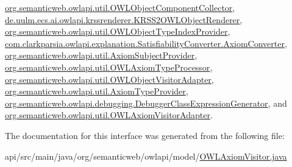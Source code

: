 \hyperlink{classorg_1_1semanticweb_1_1owlapi_1_1util_1_1_o_w_l_object_component_collector_a9f622ddb1305e79e43d2d63a2e794587}{org.\-semanticweb.\-owlapi.\-util.\-O\-W\-L\-Object\-Component\-Collector}, \hyperlink{classde_1_1uulm_1_1ecs_1_1ai_1_1owlapi_1_1krssrenderer_1_1_k_r_s_s2_o_w_l_object_renderer_a200946d7aa46b7c064fdb53d73cddd9e}{de.\-uulm.\-ecs.\-ai.\-owlapi.\-krssrenderer.\-K\-R\-S\-S2\-O\-W\-L\-Object\-Renderer}, \hyperlink{classorg_1_1semanticweb_1_1owlapi_1_1util_1_1_o_w_l_object_type_index_provider_a4288f2f2073c418591f9f8549350c166}{org.\-semanticweb.\-owlapi.\-util.\-O\-W\-L\-Object\-Type\-Index\-Provider}, \hyperlink{classcom_1_1clarkparsia_1_1owlapi_1_1explanation_1_1_satisfiability_converter_1_1_axiom_converter_a9184ebe1647be4b1200a388e9898b145}{com.\-clarkparsia.\-owlapi.\-explanation.\-Satisfiability\-Converter.\-Axiom\-Converter}, \hyperlink{classorg_1_1semanticweb_1_1owlapi_1_1util_1_1_axiom_subject_provider_ad9e13eac0428964cd2d5eb4f854c71db}{org.\-semanticweb.\-owlapi.\-util.\-Axiom\-Subject\-Provider}, \hyperlink{classorg_1_1semanticweb_1_1owlapi_1_1util_1_1_o_w_l_axiom_type_processor_ac7007f8b45fa031633e257ae42fad9b6}{org.\-semanticweb.\-owlapi.\-util.\-O\-W\-L\-Axiom\-Type\-Processor}, \hyperlink{classorg_1_1semanticweb_1_1owlapi_1_1util_1_1_o_w_l_object_visitor_adapter_af7c7cf79cae58c455cbc36b951efda98}{org.\-semanticweb.\-owlapi.\-util.\-O\-W\-L\-Object\-Visitor\-Adapter}, \hyperlink{classorg_1_1semanticweb_1_1owlapi_1_1util_1_1_axiom_type_provider_af3251abd4de117b339fec080d498944a}{org.\-semanticweb.\-owlapi.\-util.\-Axiom\-Type\-Provider}, \hyperlink{classorg_1_1semanticweb_1_1owlapi_1_1debugging_1_1_debugger_class_expression_generator_a5ce8512fde4277c52d807a84b1bcacea}{org.\-semanticweb.\-owlapi.\-debugging.\-Debugger\-Class\-Expression\-Generator}, and \hyperlink{classorg_1_1semanticweb_1_1owlapi_1_1util_1_1_o_w_l_axiom_visitor_adapter_a28cf168e7c3f2ae3154f8aebcc3c1b62}{org.\-semanticweb.\-owlapi.\-util.\-O\-W\-L\-Axiom\-Visitor\-Adapter}.



The documentation for this interface was generated from the following file\-:\begin{DoxyCompactItemize}
\item 
api/src/main/java/org/semanticweb/owlapi/model/\hyperlink{_o_w_l_axiom_visitor_8java}{O\-W\-L\-Axiom\-Visitor.\-java}\end{DoxyCompactItemize}
